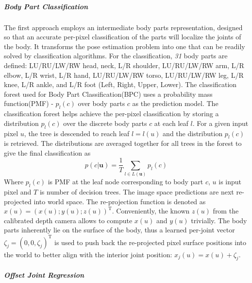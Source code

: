 \subparagraph{Body Part Classification} %
\label{subp:bpc} 
The first approach employs an intermediate body parts representation, designed so that an accurate per-pixel classification of the parts will localize the joints of the body. It transforms the pose estimation problem into one that can be readily solved by classification algorithms. For the classification, \emph{31} body parts are defined: LU/RU/LW/RW head, neck, L/R shoulder, LU/RU/LW/RW arm, L/R elbow, L/R wrist, L/R hand, LU/RU/LW/RW torso, LU/RU/LW/RW leg, L/R knee, L/R ankle, and L/R foot (Left, Right, Upper, Lower). The classification forest used for Body Part Classification(BPC) uses a probability mass function(PMF) - $p_l(c)$ over body parts $c$ as the prediction model. The classification forest helps achieve the per-pixel classification by storing a distribution $p_l(c)$ over the discrete body parts $c$ at each leaf $l$. For a given input pixel $u$, the tree is descended to reach leaf $l = l(u)$ and the distribution $p_l(c)$ is retrieved. The distributions are averaged together for all trees in the forest to give the final classification as
\begin{equation}
p(c\vert \textbf{u}) = \frac{1}{T}\sum_{l\in L(\textbf{u})} p_l(c)
\label{eqn:bpc_dist}
\end{equation}
Where $p_l(c)$ is PMF at the leaf node corresponding to body part $c$, $u$ is input pixel and $T$ is number of decision trees. The image space predictions are next re-projected into world space. The re-projection function is denoted as $x(u) = (x(u); y(u); z(u))^\text{T}$. Conveniently, the known $z(u)$ from the calibrated depth camera allows to compute $x(u)$ and $y(u)$ trivially. The body parts inherently lie on the surface of the body, thus a learned per-joint vector ${\zeta_j} = (0,0,\zeta_j)^\text{T}$ is used to push back the re-projected pixel surface positions into the world to better align with the interior joint position: $x_j(u) = x(u) + {\zeta_j}$. 
\subparagraph{Offset Joint Regression} %
\label{subp:ojr}  
